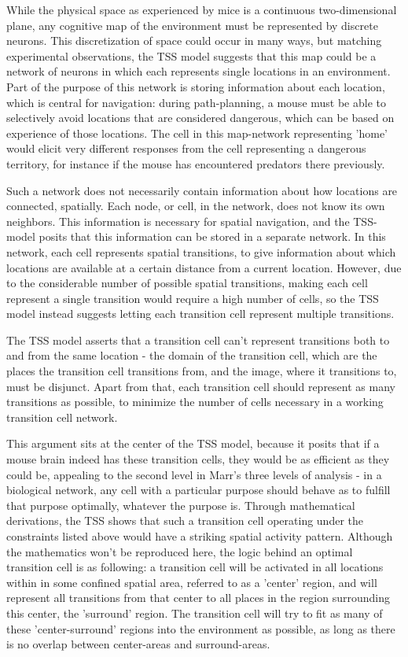 \documentclass{article}
\begin{document}
    While the physical space as experienced by mice is a continuous two-dimensional plane, any cognitive map of the environment must be represented by discrete neurons. This discretization of space could occur in many ways, but matching experimental observations, the TSS model suggests that this map could be a network of neurons in which each represents single locations in an environment. Part of the purpose of this network is storing information about each location, which is central for navigation: during path-planning, a mouse must be able to selectively avoid locations that are considered dangerous, which can be based on experience of those locations. The cell in this map-network representing 'home' would elicit very different responses from the cell representing a dangerous territory, for instance if the mouse has encountered predators there previously.

    Such a network does not necessarily contain information about how locations are connected, spatially. Each node, or cell, in the network, does not know its own neighbors. This information is necessary for spatial navigation, and the TSS-model posits that this information can be stored in a separate network. In this network, each cell represents spatial transitions, to give information about which locations are available at a certain distance from a current location. However, due to the considerable number of possible spatial transitions, making each cell represent a single transition would require a high number of cells, so the TSS model instead suggests letting each transition cell represent multiple transitions.

    The TSS model asserts that a transition cell can't represent transitions both to and from the same location - the domain of the transition cell, which are the places the transition cell transitions from, and the image, where it transitions to, must be disjunct. Apart from that, each transition cell should represent as many transitions as possible, to minimize the number of cells necessary in a working transition cell network.

    This argument sits at the center of the TSS model, because it posits that if a mouse brain indeed has these transition cells, they would be as efficient as they could be, appealing to the second level in Marr's three levels of analysis - in a biological network, any cell with a particular purpose should behave as to fulfill that purpose optimally, whatever the purpose is.
    Through mathematical derivations, the TSS shows that such a transition cell operating under the constraints listed above would have a striking spatial activity pattern. Although the mathematics won't be reproduced here, the logic behind an optimal transition cell is as following:
    a transition cell will be activated in all locations within in some confined spatial area, referred to as a 'center' region, and will represent all transitions from that center to all places in the region surrounding this center, the 'surround' region. The transition cell will try to fit as many of these 'center-surround' regions into the environment as possible, as long as there is no overlap between center-areas and surround-areas.
\end{document}
